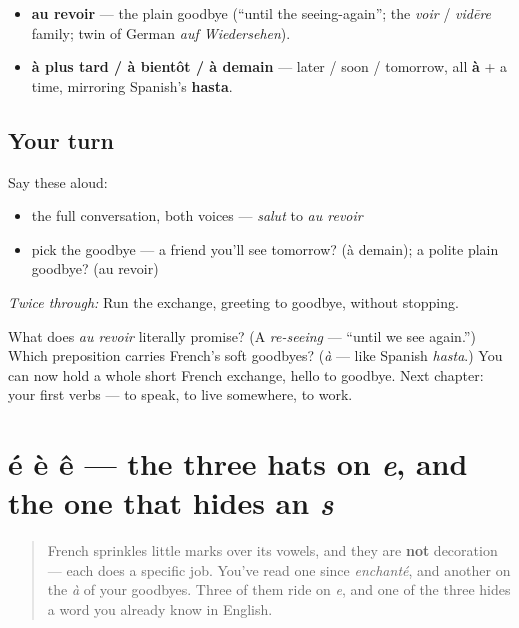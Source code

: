\begin{grammarlens}[title={What you've built this chapter}]
\begin{itemize}
\raggedright
  \item \textbf{au revoir} — the plain goodbye (\textquotedblleft{}until the seeing-again\textquotedblright{}; the \emph{voir} / \emph{vidēre} family; twin of German \emph{auf Wiedersehen}).
  \item \textbf{à plus tard / à bientôt / à demain} — later / soon / tomorrow, all \textbf{à} + a time, mirroring Spanish's \textbf{hasta}.
\end{itemize}
\end{grammarlens}

\subsection*{Your turn}
Say these aloud:

\begin{itemize}
\raggedright
  \item the full conversation, both voices — \emph{salut} to \emph{au revoir}
  \item pick the goodbye — a friend you'll see tomorrow? (à demain); a polite plain goodbye? (au revoir)
\end{itemize}

\emph{Twice through:} Run the exchange, greeting to goodbye, without stopping.

\begin{tcolorbox}[breakable,colback=teal!4,colframe=teal!35!black,title={Before you move on}]
What does \emph{au revoir} literally promise? (A \emph{re-seeing} — \textquotedblleft{}until we see again.\textquotedblright{}) Which preposition carries French's soft goodbyes? (\emph{à} — like Spanish \emph{hasta}.) You can now hold a whole short French exchange, hello to goodbye. Next chapter: your first verbs — to speak, to live somewhere, to work.
\end{tcolorbox}
\section[é è ê]{é è ê — the three hats on \emph{e}, and the one that hides an \emph{s}}

\label{lesson:FR-W01-accents}



\begin{quote}
French sprinkles little marks over its vowels, and they are \textbf{not} decoration — each does a specific job. You've read one since \emph{enchanté}, and another on the \emph{à} of your goodbyes. Three of them ride on \emph{e}, and one of the three hides a word you already know in English.
\end{quote}

